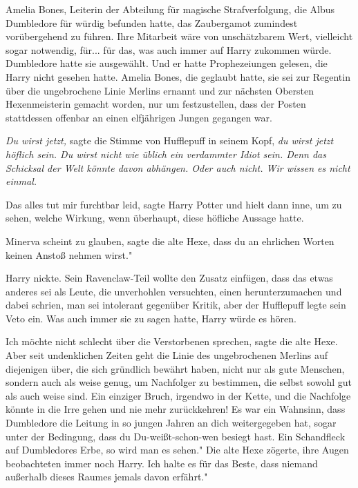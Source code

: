 Amelia Bones, Leiterin der Abteilung für magische Strafverfolgung, die Albus
Dumbledore für würdig befunden hatte, das Zaubergamot zumindest vorübergehend zu
führen. Ihre Mitarbeit wäre von unschätzbarem Wert, vielleicht sogar notwendig,
für... für das, was auch immer auf Harry zukommen würde. Dumbledore hatte sie
ausgewählt. Und er hatte Prophezeiungen gelesen, die Harry nicht gesehen hatte.
Amelia Bones, die geglaubt hatte, sie sei zur Regentin über die ungebrochene
Linie Merlins ernannt und zur nächsten Obersten Hexenmeisterin gemacht worden,
nur um festzustellen, dass der Posten stattdessen offenbar an einen elfjährigen
Jungen gegangen war.

\emph{Du wirst jetzt,} sagte die Stimme von Hufflepuff in seinem Kopf,\emph{ du
wirst jetzt höflich sein. Du wirst nicht wie üblich ein verdammter Idiot sein.
Denn das Schicksal der Welt könnte davon abhängen. Oder auch nicht. Wir wissen
es nicht einmal.}

\glqq{}Das alles tut mir furchtbar leid\grqq{}, sagte Harry Potter und hielt dann
inne, um zu sehen, welche Wirkung, wenn überhaupt, diese höfliche Aussage hatte.

\glqq{}Minerva scheint zu glauben\grqq{}, sagte die alte Hexe, \glqq{}dass du an
ehrlichen Worten keinen Anstoß nehmen wirst."

Harry nickte. Sein Ravenclaw-Teil wollte den Zusatz einfügen, dass das etwas
anderes sei als Leute, die unverhohlen versuchten, einen herunterzumachen und
dabei schrien, man sei intolerant gegenüber Kritik, aber der Hufflepuff legte
sein Veto ein. Was auch immer sie zu sagen hatte, Harry würde es hören.

\glqq{}Ich möchte nicht schlecht über die Verstorbenen sprechen\grqq{}, sagte die
alte Hexe. \glqq{}Aber seit undenklichen Zeiten geht die Linie des ungebrochenen
Merlins auf diejenigen über, die sich gründlich bewährt haben, nicht nur als
gute Menschen, sondern auch als weise genug, um Nachfolger zu bestimmen, die
selbst sowohl gut als auch weise sind. Ein einziger Bruch, irgendwo in der
Kette, und die Nachfolge könnte in die Irre gehen und nie mehr zurückkehren! Es
war ein Wahnsinn, dass Dumbledore die Leitung in so jungen Jahren an dich
weitergegeben hat, sogar unter der Bedingung, dass du Du-weißt-schon-wen besiegt
hast. Ein Schandfleck auf Dumbledores Erbe, so wird man es sehen." Die alte Hexe
zögerte, ihre Augen beobachteten immer noch Harry. \glqq{}Ich halte es für das
Beste, dass niemand außerhalb dieses Raumes jemals davon erfährt."

